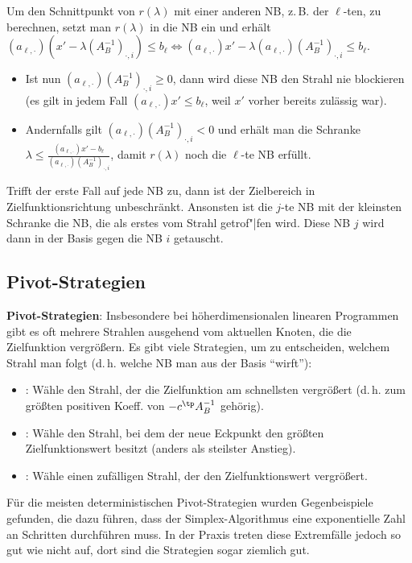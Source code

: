 Um den Schnittpunkt von $r(\lambda)$ mit einer anderen NB, z.\,B. der $\ell$-ten, zu
berechnen, setzt man $r(\lambda)$ in die NB ein und erhält
$(a_{\ell,\cdot}) (x' - \lambda (A_B^{-1})_{\cdot,i}) \le b_\ell
\iff (a_{\ell,\cdot}) x' - \lambda (a_{\ell,\cdot}) (A_B^{-1})_{\cdot,i} \le b_\ell$.
\begin{itemize}
    \item
    Ist nun $(a_{\ell,\cdot}) (A_B^{-1})_{\cdot,i} \ge 0$,
    dann wird diese NB den Strahl nie blockieren\\
    (es gilt in jedem Fall $(a_{\ell,\cdot}) x' \le b_\ell$,
    weil $x'$ vorher bereits zulässig war).

    \item
    Andernfalls gilt $(a_{\ell,\cdot}) (A_B^{-1})_{\cdot,i} < 0$ und erhält man die Schranke
    $\lambda \le \frac{(a_{\ell,\cdot}) x' - b_\ell}{(a_{\ell,\cdot}) (A_B^{-1})_{\cdot,i}}$,
    damit $r(\lambda)$ noch die $\ell$-te NB erfüllt.
\end{itemize}
Trifft der erste Fall auf jede NB zu, dann ist der Zielbereich in Zielfunktionsrichtung
unbeschränkt.
Ansonsten ist die $j$-te NB mit der kleinsten Schranke die NB, die als erstes vom Strahl
getrof"|fen wird.
Diese NB $j$ wird dann in der Basis gegen die NB $i$ getauscht.

\pagebreak

\subsection{%
    Pivot-Strategien%
}

\textbf{Pivot-Strategien}:
Insbesondere bei höherdimensionalen linearen Programmen gibt es oft mehrere Strahlen
ausgehend vom aktuellen Knoten, die die Zielfunktion vergrößern.
Es gibt viele Strategien, um zu entscheiden, welchem Strahl man folgt
(d.\,h. welche NB man aus der Basis "`wirft"'):
\begin{itemize}
    \item
    :
    Wähle den Strahl, der die Zielfunktion am schnellsten vergrößert
    (d.\,h. zum größten positiven Koeff. von $-c^\tp A_B^{-1}$ gehörig).

    \item
    :
    Wähle den Strahl, bei dem der neue Eckpunkt den größten Zielfunktionswert besitzt
    (anders als steilster Anstieg).

    \item
    :
    Wähle einen zufälligen Strahl, der den Zielfunktionswert vergrößert.
\end{itemize}
Für die meisten deterministischen Pivot-Strategien wurden Gegenbeispiele gefunden,
die dazu führen, dass der Simplex-Algorithmus eine exponentielle Zahl an Schritten durchführen
muss.
In der Praxis treten diese Extremfälle jedoch so gut wie nicht auf,
dort sind die Strategien sogar ziemlich gut.

